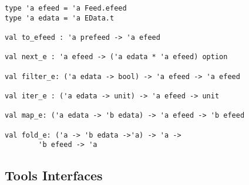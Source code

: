 {\begin{verbatim}
type 'a efeed = 'a Feed.efeed
type 'a edata = 'a EData.t

val to_efeed : 'a prefeed -> 'a efeed

val next_e : 'a efeed -> ('a edata * 'a efeed) option

val filter_e: ('a edata -> bool) -> 'a efeed -> 'a efeed

val iter_e : ('a edata -> unit) -> 'a efeed -> unit

val map_e: ('a edata -> 'b edata) -> 'a efeed -> 'b efeed

val fold_e: ('a -> 'b edata ->'a) -> 'a -> 
		'b efeed -> 'a
\end{verbatim}
}

\subsection{Tools Interfaces}
